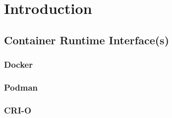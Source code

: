 \section{Introduction} \label{sec:k8sFuntamentals}
\subsection{Container Runtime Interface(s)}
\subsubsection{Docker}
\subsubsection{Podman}
\subsubsection{CRI-O}

